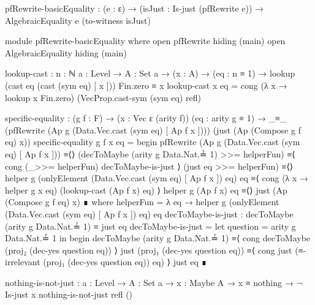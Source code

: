 \documentclass{report}
\begin{document}
\begin{code}
    pfRewrite-basicEquality :
      (e : ε) →
      (isJust : Is-just (pfRewrite e)) →
      AlgebraicEquality e (to-witness isJust)

    module pfRewrite-basicEquality where
      open pfRewrite hiding (main)
      open AlgebraicEquality hiding (main)

      lookup-cast :
        {n : ℕ}
        {a : Level} →
        {A : Set a} →
        (x : A) →
        (eq : n ≡ 1) →
        lookup (cast eq (cast (sym eq) [ x ])) Fin.zero ≡ x
      lookup-cast x eq = cong (λ x → lookup x Fin.zero)
                              (VecProp.cast-sym (sym eq) refl)

      specific-equality :
        (g f : F) →
        (x : Vec ε (arity f))
        (eq : arity g ≡ 1) →
        _≡_ (pfRewrite (Ap g (Data.Vec.cast (sym eq) [ Ap f x ])))
            (just (Ap (Compose g f eq) x))
      specific-equality g f x eq = begin
        pfRewrite (Ap g (Data.Vec.cast (sym eq) [ Ap f x ]))
          ≡⟨⟩
        (decToMaybe (arity g Data.Nat.≟ 1) >>= helperFun)
          ≡⟨ cong (_>>= helperFun) decToMaybe-is-just ⟩
        (just eq >>= helperFun)
          ≡⟨⟩
        helper g (onlyElement (Data.Vec.cast (sym eq) [ Ap f x ]) eq) eq
          ≡⟨ cong (λ x → helper g x eq) (lookup-cast (Ap f x) eq) ⟩
        helper g (Ap f x) eq
          ≡⟨⟩
        just (Ap (Compose g f eq) x) ∎
        where
        helperFun =
          λ eq → helper g
                        (onlyElement (Data.Vec.cast (sym eq)
                                                    [ Ap f x ])
                                     eq)
                        eq
        decToMaybe-is-just : decToMaybe (arity g Data.Nat.≟ 1) ≡ just eq
        decToMaybe-is-just = let question = arity g Data.Nat.≟ 1 in begin
          decToMaybe (arity g Data.Nat.≟ 1)
            ≡⟨ cong decToMaybe (proj₂ (dec-yes question eq)) ⟩
          just (proj₁ (dec-yes question eq))
            ≡⟨ cong just (≡-irrelevant (proj₁ (dec-yes question eq)) eq) ⟩
          just eq ∎

      nothing-is-not-just :
        {a : Level} →
        {A : Set a} →
        {x : Maybe A} →
        x ≡ nothing →
        ¬ Is-just x
      nothing-is-not-just refl ()


\end{code}
\end{document}
